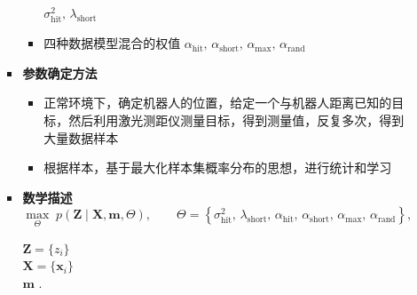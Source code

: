 \documentclass[../main.tex]{subfiles}
\begin{document}
\begin{enumerate}
\begin{itemize}
\begin{itemize}
\begin{itemize}
                    $\sigma_{\mathrm{hit}}^{2},\,\lambda_{\mathrm{short}}$
                    \item 四种数据模型混合的权值 $\alpha_{\mathrm{hit}},\,\alpha_{\mathrm{short}},\,\alpha_{\mathrm{max}},\,\alpha_{\mathrm{rand}}$
                \end{itemize}
                \item \textbf{参数确定方法}
                \begin{itemize}
                    \item 正常环境下，确定机器人的位置，给定一个与机器人距离已知的目标，然后利用激光测距仪测量目标，得到测量值，反复多次，得到大量数据样本
                    \item 根据样本，基于最大化样本集概率分布的思想，进行统计和学习
                \end{itemize}
                \item \textbf{数学描述}
                    \[
                    \max_{\Theta}\; p\!\left(\mathbf{Z}\mid \mathbf{X},\mathbf{m},\Theta\right),\qquad
                    \Theta=\left\{\sigma_{\mathrm{hit}}^{2},\,\lambda_{\mathrm{short}},\,\alpha_{\mathrm{hit}},\,\alpha_{\mathrm{short}},\,\alpha_{\mathrm{max}},\,\alpha_{\mathrm{rand}}\right\},
                    \]
                    
                    $\mathbf{Z}=\{z_i\}$ \\
                    $\mathbf{X}=\{\mathbf{x}_i\}$ \\
                    $\mathbf{m}$ .
                    

\end{itemize}
\end{itemize}
\end{enumerate}
\end{document}
